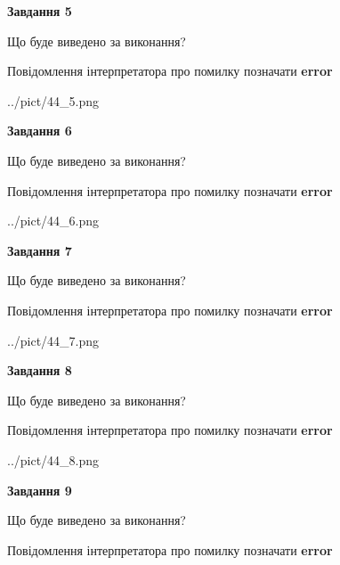 \documentclass[11pt, ukrainian]{article}
\begin{document}
{\begin {large}
{\begin {center}\textbf{Завдання 5}\end {center}}\par
Що буде виведено за виконання? \par
Повідомлення інтерпретатора про помилку позначати \textbf{error}

\begin{center}
	{../pict/44_5.png}
\end{center}
\newpage

{\begin {center}\textbf{Завдання 6}\end {center}}\par
Що буде виведено за виконання? \par
Повідомлення інтерпретатора про помилку позначати \textbf{error}

\begin{center}
	{../pict/44_6.png}
\end{center}
\newpage

{\begin {center}\textbf{Завдання 7}\end {center}}\par
Що буде виведено за виконання? \par
Повідомлення інтерпретатора про помилку позначати \textbf{error}

\begin{center}
	{../pict/44_7.png}
\end{center}
\newpage

{\begin {center}\textbf{Завдання 8}\end {center}}\par
Що буде виведено за виконання? \par
Повідомлення інтерпретатора про помилку позначати \textbf{error}

\begin{center}
	{../pict/44_8.png}
\end{center}
\newpage

{\begin {center}\textbf{Завдання 9}\end {center}}\par
Що буде виведено за виконання? \par
Повідомлення інтерпретатора про помилку позначати \textbf{error}


\end{large}}
\end{document}
